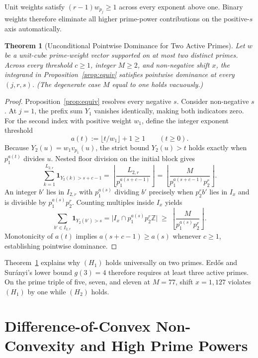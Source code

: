 \documentclass[11pt]{article}
\newtheorem{theorem}{Theorem}
\begin{document}
Unit weights satisfy $(r - 1) w_{p_j} \ge 1$ across every exponent above one. Binary weights therefore eliminate all higher prime-power contributions on the positive-$s$ axis automatically.

\begin{theorem}[Unconditional Pointwise Dominance for Two Active Primes]
\label{thm:twoprime}
Let $w$ be a unit-cube prime-weight vector supported on at most two distinct primes. Across every threshold $c \ge 1$, integer $M \ge 2$, and non-negative shift $x$, the integrand in Proposition~\ref{prop:equiv} satisfies pointwise dominance at every $(j, r, s)$. (The degenerate case $M$ equal to one holds vacuously.)
\end{theorem}
\begin{proof}
Proposition~\ref{prop:equiv} resolves every negative $s$. Consider non-negative $s$. At $j = 1$, the prefix sum $Y_1$ vanishes identically, making both indicators zero. For the second index with positive weight $w_1$, define the integer exponent threshold
\[
a(t) := \lfloor t / w_1 \rfloor + 1 \ge 1 \qquad (t \ge 0).
\]
Because $Y_2(u) = w_1 v_{p_1}(u)$, the strict bound $Y_2(u) > t$ holds exactly when $p_1^{a(t)}$ divides $u$. Nested floor division on the initial block gives
\[
\sum_{k = 1}^{L_{2, r}} \mathbf{1}_{Y_2(k) > s + c - 1} = \left\lfloor \frac{L_{2, r}}{p_1^{a(s + c - 1)}} \right\rfloor = \left\lfloor \frac{M}{p_1^{a(s + c - 1)} p_2^r} \right\rfloor.
\]
An integer $b'$ lies in $I_{2, r}$ with $p_1^{a(s)}$ dividing $b'$ precisely when $p_2^r b'$ lies in $I_x$ and is divisible by $p_1^{a(s)} p_2^r$. Counting multiples inside $I_x$ yields
\[
\sum_{b' \in I_{2, r}} \mathbf{1}_{Y_2(b') > s} = \bigl|I_x \cap p_1^{a(s)} p_2^r \mathbb{Z}\bigr| \;\ge\; \left\lfloor \frac{M}{p_1^{a(s)} p_2^r} \right\rfloor.
\]
Monotonicity of $a(t)$ implies $a(s + c - 1) \ge a(s)$ whenever $c \ge 1$, establishing pointwise dominance.
\end{proof}

Theorem~\ref{thm:twoprime} explains why $(H_1)$ holds universally on two primes. Erd\H{o}s and Sur\'anyi's lower bound $g(3) = 4$ therefore requires at least three active primes. On the prime triple of five, seven, and eleven at $M = 77$, shift $x = 1{,}127$ violates $(H_1)$ by one while $(H_2)$ holds.

\section{Difference-of-Convex Non-Convexity and High Prime Powers}
\end{document}
